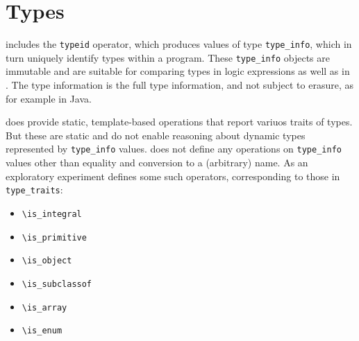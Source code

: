 \section{Types}
\label{sec:type}
\experimental

\lang{} includes the \lstinline|typeid| operator, which produces values of
type \lstinline|type_info|, which in turn uniquely identify types within
a \lang{} program. These \lstinline|type_info| objects are immutable and are suitable for comparing types in logic expressions as well as in \lang.
The type information is the full type information, and not subject to erasure,
as for example in Java.

\lang{} does provide static, template-based operations that report variuos traits of types. But these are static and do not enable reasoning about 
dynamic types represented by \lstinline|type_info| values.
\lang{} does not define any operations on \lstinline|type_info| values other than equality and conversion to a (arbitrary) name. As an exploratory experiment
\NAME{} defines some such operators, corresponding to those in \lstinline|type_traits|:
\begin{itemize}
\item  \lstinline|\is_integral|
\item \lstinline|\is_primitive|
\item \lstinline|\is_object|
\item \lstinline|\is_subclassof|
\item \lstinline|\is_array|
\item \lstinline|\is_enum|
\end{itemize}
